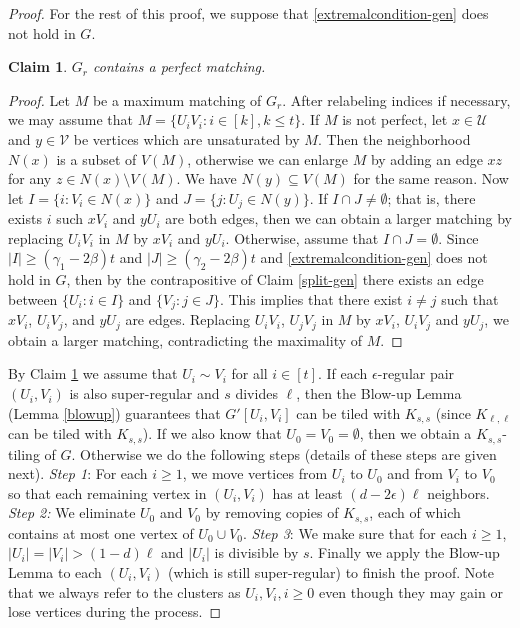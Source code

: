 \documentclass[oneside,12pt]{memoir}
\newtheorem{claim}[theorem]{Claim}
\newcommand{\ep}{\epsilon}
\begin{document}
\begin{proof}
For the rest of this proof, we suppose that \eqref{extremalcondition-gen} does not hold in $G$.

\begin{claim}\label{matching}
$G_r$ contains a perfect matching.
\end{claim}

\begin{proof}
Let $M$ be a maximum matching of $G_r$. After relabeling indices if necessary, we may assume that
$M = \{U_iV_i : i\in[k], k\leq t\}$. If $M$ is not perfect, let $x\in \mathcal{U}$ and $y \in \mathcal{V}$ be vertices which are unsaturated by $M$. Then the neighborhood $N(x)$ is a subset of $V(M)$, otherwise we can enlarge $M$ by
adding an edge $xz$ for any $z \in N(x)\setminus V(M)$. We have $N(y) \subseteq V (M)$ for the same reason.
Now let $I = \{i : V_i \in N(x)\}$ and $J = \{j : U_j\in N(y)\}$. If $I \cap J\neq \emptyset$; that is, there exists $i$
such $xV_i$ and $yU_i$ are both edges, then we can obtain a larger matching by replacing $U_iV_i$ in
$M$ by $xV_i$ and $yU_i$. Otherwise, assume that $I \cap J = \emptyset$. Since $|I|\geq (\gamma_1-2\beta)t$ and $|J|\geq (\gamma_2-2\beta)t$
and \eqref{extremalcondition-gen} does not hold in $G$, then by the contrapositive of Claim \ref{split-gen} there exists an edge
between $\{U_i : i \in I\}$ and $\{V_j : j \in J\}$. This implies that there exist $i \neq j$ such that $xV_i$,
$U_iV_j$, and $yU_j$ are edges. Replacing $U_iV_i$, $U_jV_j$ in $M$ by $xV_i$, $U_iV_j$ and $yU_j$, we obtain a larger
matching, contradicting the maximality of $M$.

\end{proof}

By Claim \ref{matching} we assume that $U_i\sim V_i$ for all $i\in [t]$.  If each $\ep$-regular pair $(U_i, V_i)$ is also super-regular and $s$ divides $\ell$, then the Blow-up Lemma (Lemma \ref{blowup}) guarantees that $G'[U_i, V_i]$ can be tiled with $K_{s,s}$ (since $K_{\ell,\ell}$ can be tiled with $K_{s,s}$). If we also know that $U_0=V_0=\emptyset$, then we obtain a $K_{s,s}$-tiling of $G$. Otherwise we do the following steps (details of these steps are given next). \emph{Step 1}: For each $i\geq 1$, we move vertices from $U_i$ to $U_0$ and from $V_i$ to $V_0$ so that each remaining vertex in $(U_i, V_i)$ has at least $(d-2\ep)\ell$ neighbors. \emph{Step 2:} We eliminate $U_0$ and $V_0$ by removing copies of $K_{s,s}$, each of which contains at most one vertex of $U_0\cup V_0$. \emph{Step 3}: We make sure that for each $i\geq 1$, $|U_i|=|V_i| > (1 - d)\ell$ and $|U_i|$ is divisible by
$s$. Finally we apply the Blow-up Lemma to each $(U_i, V_i)$ (which is still super-regular) to finish the proof. Note that we always refer to the clusters as $U_i, V_i, i \geq 0$ even though they may gain or lose vertices during the process.


\end{proof}
\end{document}
